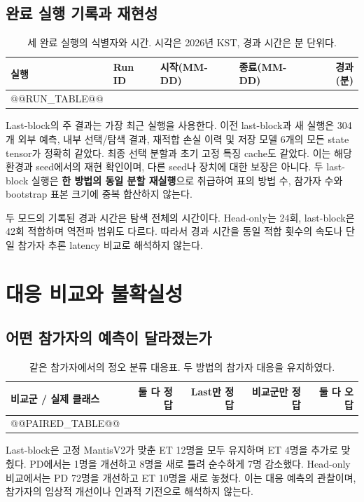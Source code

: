 \documentclass[11pt,a4paper]{article}
\begin{document}
\subsection{완료 실행 기록과 재현성}
\begin{table}[H]\centering\footnotesize\setlength{\tabcolsep}{3pt}
\caption{세 완료 실행의 식별자와 시간. 시각은 2026년 KST, 경과 시간은 분 단위다.}
\label{tab:runs}
\begin{tabular}{@{}llllr@{}}\toprule
실행 & Run ID & 시작(MM-DD) & 종료(MM-DD) & 경과(분)\\\midrule
@@RUN_TABLE@@
\bottomrule\end{tabular}
\end{table}
Last-block의 주 결과는 가장 최근 실행을 사용한다. 이전 last-block과 새 실행은
304개 외부 예측, 내부 선택/탐색 결과, 재적합 손실 이력 및
저장 모델 6개의 모든 state tensor가 정확히 같았다.
최종 선택 분할과 초기 고정 특징 cache도 같았다.
이는 해당 환경과 seed에서의 재현 확인이며, 다른 seed나 장치에 대한 보장은 아니다.
두 last-block 실행은 \textbf{한 방법의 동일 분할 재실행}으로 취급하여
표의 방법 수, 참가자 수와 bootstrap 표본 크기에 중복 합산하지 않는다.

두 모드의 기록된 경과 시간은 탐색 전체의 시간이다.
Head-only는 24회, last-block은 42회 적합하며 역전파 범위도 다르다.
따라서 경과 시간을 동일 적합 횟수의 속도나 단일 참가자 추론 latency 비교로 해석하지 않는다.
\clearpage

\section{대응 비교와 불확실성}
\subsection{어떤 참가자의 예측이 달라졌는가}
\begin{table}[H]\centering\small\setlength{\tabcolsep}{4pt}
\caption{같은 참가자에서의 정오 분류 대응표. 두 방법의 참가자 대응을 유지하였다.}
\begin{tabular}{@{}lrrrr@{}}\toprule
비교군 / 실제 클래스 & 둘 다 정답 & Last만 정답 & 비교군만 정답 & 둘 다 오답\\\midrule
@@PAIRED_TABLE@@
\bottomrule\end{tabular}
\end{table}
Last-block은 고정 MantisV2가 맞춘 ET 12명을 모두 유지하며 ET 4명을 추가로 맞췄다.
PD에서는 1명을 개선하고 8명을 새로 틀려 순수하게 7명 감소했다.
Head-only 비교에서는 PD 72명을 개선하고 ET 10명을 새로 놓쳤다.
이는 대응 예측의 관찰이며, 참가자의 임상적 개선이나 인과적 기전으로 해석하지 않는다.
\end{document}
